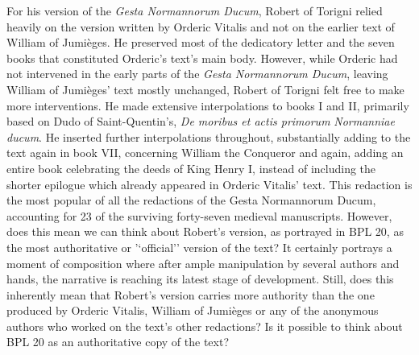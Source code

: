 \begin{paper}
For his version of the \emph{Gesta Normannorum Ducum}, Robert of Torigni
relied heavily on the version written by Orderic Vitalis and not on the
earlier text of William of Jumièges. He preserved most of the dedicatory
letter and the seven books that constituted Orderic's text's main body.
However, while Orderic had not intervened in the early parts of the
\emph{Gesta Normannorum Ducum}, leaving William of Jumièges' text mostly
unchanged, Robert of Torigni felt free to make more interventions. He
made extensive interpolations to books I and II, primarily based on Dudo
of Saint-Quentin's, \emph{De moribus et actis primorum} \emph{Normanniae
ducum}. He inserted further interpolations throughout, substantially
adding to the text again in book VII, concerning William the Conqueror
\citep[lxxxii]{van_houts_gesta_1992} and again, adding an entire book celebrating
the deeds of King Henry I, instead of including the shorter epilogue
which already appeared in Orderic Vitalis' text. This redaction is the
most popular of all the redactions of the Gesta Normannorum Ducum,
accounting for 23 of the surviving forty-seven medieval manuscripts.
However, does this mean we can think about Robert's version, as
portrayed in BPL 20, as the most authoritative or '`official'' version of
the text? It certainly portrays a moment of composition where after ample
manipulation by several authors and hands, the narrative is reaching its
latest stage of development. Still, does this inherently mean that Robert's
version carries more authority than the one produced by Orderic Vitalis,
William of Jumièges or any of the anonymous authors who worked on the
text's other redactions? Is it possible to think about BPL 20 as an
authoritative copy of the text?


\end{paper}
